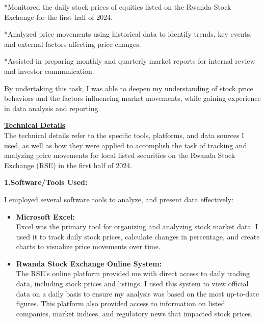 \documentclass{article}
\begin{document}
\begin{titlepage}
\begin{titlepage}
\begin{titlepage}
\begin{flushleft}
*Monitored the daily stock prices of equities  listed on the Rwanda Stock Exchange for the first half of 2024.\\
\vspace{0.3cm}

*Analyzed price movements using historical data to identify trends, key events, and external factors affecting price changes.\\
\vspace{0.3cm}

*Assisted in preparing monthly and quarterly market reports for internal review and investor communication.
\vspace{0.3cm}

By undertaking this task, I was able to deepen my understanding of stock price behaviors and the factors influencing market movements, while gaining experience in data analysis and reporting.


\end{flushleft}

\end{titlepage}

\setcounter{page}{10}

\begin{flushleft}
    \textbf{\underline{Technical Details}}
\vspace{0.3cm}
\\
The technical details refer to the specific tools, platforms, and data sources I used, as well as how they were applied to accomplish the task of tracking and analyzing price movements for local listed securities on the Rwanda Stock Exchange (RSE) in the first half of 2024.
\vspace{0.3cm}

\textbf{1.Software/Tools Used:}
\vspace{0.2cm}

I employed several software tools to analyze, and present data effectively:
\begin{itemize}
    \item \textbf{Microsoft Excel:}
    \\
    
    Excel was the primary tool for organizing and analyzing stock market data. I used it to track daily stock prices, calculate changes in percentage, and create charts to visualize price movements over time.

    \item \textbf{Rwanda Stock Exchange Online System:}
    \\
    The RSE's online platform provided me with direct access to daily trading data, including stock prices and listings. I used this system to view official data on a daily basis to ensure my analysis was based on the most up-to-date figures. This platform also provided access to information on listed companies, market indices, and regulatory news that impacted stock prices.


\end{itemize}
\end{flushleft}
\end{titlepage}
\end{titlepage}
\end{document}
